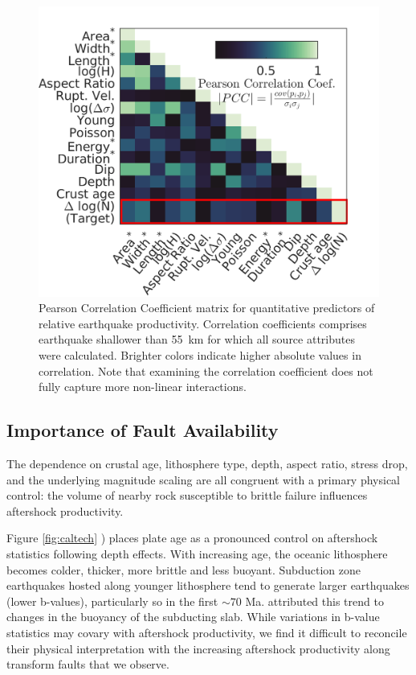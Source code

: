 \documentclass[draft, jgrga]{agujournal2018}
\begin{document}
 \begin{figure}
    \centering
    \includegraphics{figures/covariance_plot.png}
    \caption{Pearson Correlation Coefficient matrix for quantitative predictors of relative earthquake productivity. Correlation coefficients comprises earthquake shallower than 55~km for which all source attributes were calculated. Brighter colors indicate higher absolute values in correlation. Note that examining the correlation coefficient does not fully capture more non-linear interactions.}
    \label{fig:covariance}
\end{figure}   
    
\subsection{Importance of Fault Availability}

The dependence on crustal age, lithosphere type, depth, aspect ratio, stress drop, and the underlying magnitude scaling are all congruent with a primary physical control: the volume of nearby rock susceptible to brittle failure influences aftershock productivity. 

Figure \ref{fig:caltech} ) places plate age as a pronounced control on aftershock statistics following depth effects. With increasing age, the oceanic lithosphere becomes colder, thicker, more brittle and less buoyant. Subduction zone earthquakes hosted along younger lithosphere tend to generate larger earthquakes (lower b-values), particularly so in the first $\sim70$ Ma. \citet{Nishikawa2014EarthquakeBuoyancy} attributed this trend to changes in the buoyancy of the subducting slab. While variations in b-value statistics may covary with aftershock productivity, we find it difficult to reconcile their physical interpretation with the increasing aftershock productivity along transform faults that we observe. 
\end{document}
